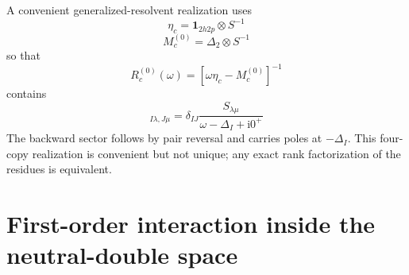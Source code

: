\documentclass[aip,jcp,reprint,noshowkeys,superscriptaddress]{revtex4-1}
\newcommand{\ii}{\mathrm{i}}
\begin{document}
A convenient generalized-resolvent realization uses
\begin{equation}
	\eta_c
	=
	\mathbf 1_{2h2p}\otimes S^{-1}
	\label{eq:eta_core}
\end{equation}
\begin{equation}
	M_c^{(0)}
	=
	\Delta_2\otimes S^{-1}
	\label{eq:M_core_zero}
\end{equation}
so that
\begin{equation}
	R_c^{(0)}(\omega)
	=
	[\omega\eta_c-M_c^{(0)}]^{-1}
	\label{eq:R_core_zero}
\end{equation}
contains
\begin{equation}
	[R_c^{(0)}(\omega)]_{I\lambda,J\mu}
	=
	\delta_{IJ}
	\frac{S_{\lambda\mu}}
	{\omega-\Delta_I+\ii0^+}
	\label{eq:R_core_elements}
\end{equation}
The backward sector follows by pair reversal and carries poles at $-\Delta_I$.
This four-copy realization is convenient but not unique; any exact rank factorization of the residues is equivalent.

\section[Neutral-double interaction]{First-order interaction inside the neutral-double space}
\label{sec:double_interaction}
\end{document}
